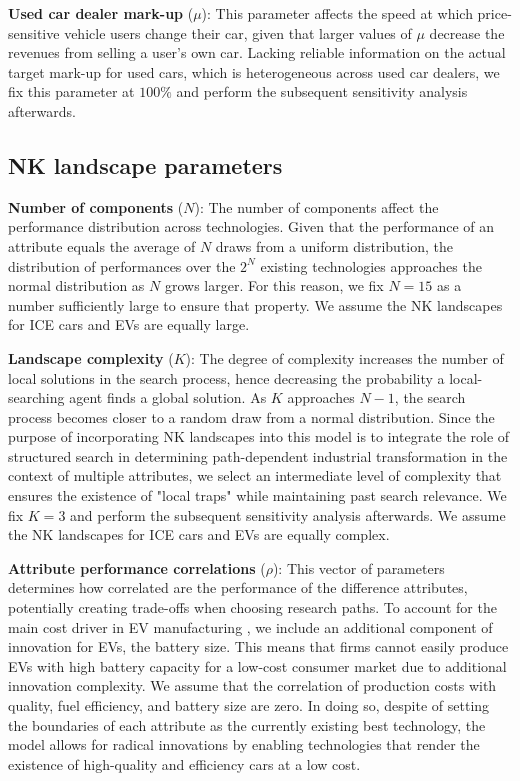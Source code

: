 \documentclass[12pt]{article}
\begin{document}
	\textbf{Used car dealer mark-up} ($\mu$): This parameter affects the speed at which price-sensitive vehicle users change their car, given that larger values of $\mu$ decrease the revenues from selling a user's own car. Lacking reliable information on the actual target mark-up for used cars, which is heterogeneous across used car dealers, we fix this parameter at $100\%$ and perform the subsequent sensitivity analysis afterwards.
	
	\subsection{NK landscape parameters} \label{Callibration_NK}
	
	\textbf{Number of components} ($N$): The number of components affect the performance distribution across technologies. Given that the performance of an attribute equals the average of $N$ draws from a uniform distribution, the distribution of performances over the $2^N$ existing technologies approaches the normal distribution as $N$ grows larger. For this reason, we fix $N=15$ as a number sufficiently large to ensure that property. We assume the NK landscapes for ICE cars and EVs are equally large.
	
	\textbf{Landscape complexity} ($K$): The degree of complexity increases the number of local solutions in the search process, hence decreasing the probability a local-searching agent finds a global solution. As $K$ approaches $N-1$, the search process becomes closer to a random draw from a normal distribution. Since the purpose of incorporating NK landscapes into this model is to integrate the role of structured search in determining path-dependent industrial transformation in the context of multiple attributes, we select an intermediate level of complexity that ensures the existence of "local traps" while maintaining past search relevance. We fix $K=3$ and perform the subsequent sensitivity analysis afterwards. We assume the NK landscapes for ICE cars and EVs are equally complex.
	
	\textbf{Attribute performance correlations} ($\rho$): This vector of parameters determines how correlated are the performance of the difference attributes, potentially creating trade-offs when choosing research paths. To account for the main cost driver in EV manufacturing \cite{konig2021overview}, we include an additional component of innovation for EVs, the battery size. This means that firms cannot easily produce EVs with high battery capacity for a low-cost consumer market due to additional innovation complexity. We assume that the correlation of production costs with quality, fuel efficiency, and battery size are zero. In doing so, despite of setting the boundaries of each attribute as the currently existing best technology, the model allows for radical innovations by enabling technologies that render the existence of high-quality and efficiency cars at a low cost.  
	
\end{document}
